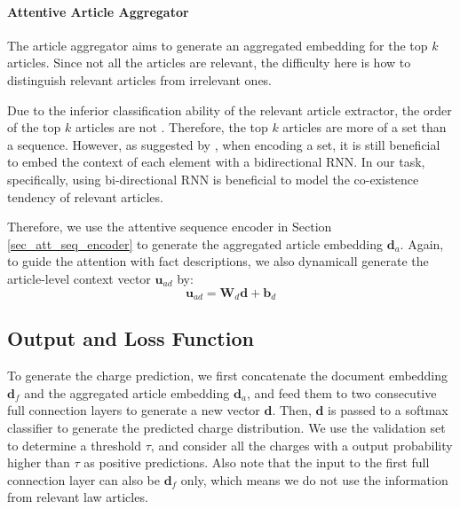 \paragraph{Attentive Article Aggregator}
The article aggregator aims to generate an aggregated embedding for the top $k$ articles. Since not all the articles are relevant, the difficulty here is how to distinguish relevant articles from irrelevant ones.

Due to the inferior classification ability of the relevant article extractor, the order of the top $k$ articles are not . Therefore, the top $k$ articles are more of a set than a sequence. However, as suggested by \cite{vinyals2016matching}, when encoding a set, it is still beneficial to embed the context of each element with a bidirectional RNN.
In our task, specifically, using bi-directional RNN is beneficial to model the co-existence tendency of relevant articles.

Therefore, we use the attentive sequence encoder in Section \ref{sec_att_seq_encoder} to generate the aggregated article embedding $\mathbf{d}_a$. Again, to guide the attention with fact descriptions, we also dynamicall generate the article-level context vector $\mathbf{u}_{ad}$ by:
\begin{equation}
\mathbf{u}_{ad} = \mathbf{W}_d \mathbf{d} + \mathbf{b}_d
\end{equation}


\subsection{Output and Loss Function}
To generate the charge prediction, we first concatenate the document embedding $\mathbf{d}_f$ and the aggregated article embedding $\mathbf{d}_a$, and feed them to two consecutive full connection layers to generate a new vector $\mathbf{d}$. Then, $\mathbf{d}$ is passed to a softmax classifier to generate the predicted charge distribution. We use the validation set to determine a threshold $\tau$, and consider all the charges with a output probability higher than $\tau$ as positive predictions.
Also note that the input to the first full connection layer can also be $\mathbf{d}_f$ only, which means we do not use the information from relevant law articles.

